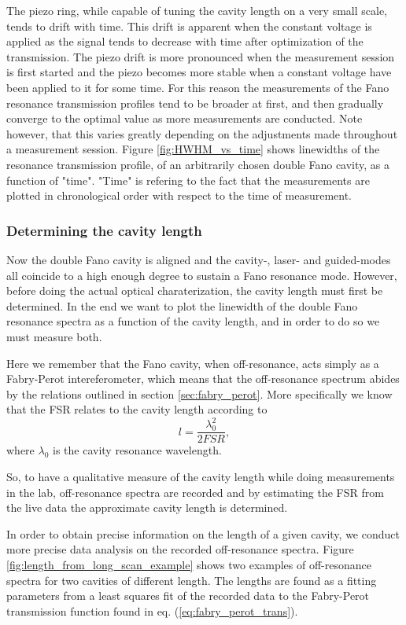 The piezo ring, while capable of tuning the cavity length on a very small scale, tends to drift with time. This drift is apparent when the constant voltage is applied as the signal tends to decrease with time after optimization of the transmission. The piezo drift is more pronounced when the measurement session is first started and the piezo becomes more stable when a constant voltage have been applied to it for some time. For this reason the measurements of the Fano resonance transmission profiles tend to be broader at first, and then gradually converge to the optimal value as more measurements are conducted. Note however, that this varies greatly depending on the adjustments made throughout a measurement session. Figure \ref{fig:HWHM_vs_time} shows linewidths of the resonance transmission profile, of an arbitrarily chosen double Fano cavity, as a function of "time". "Time" is refering to the fact that the measurements are plotted in chronological order with respect to the time of measurement. 

\subsubsection{Determining the cavity length}

Now the double Fano cavity is aligned and the cavity-, laser- and guided-modes all coincide to a high enough degree to sustain a Fano resonance mode. However, before doing the actual optical charaterization, the cavity length must first be determined. In the end we want to plot the linewidth of the double Fano resonance spectra as a function of the cavity length, and in order to do so we must measure both. 

Here we remember that the Fano cavity, when off-resonance, acts simply as a Fabry-Perot intereferometer, which means that the off-resonance spectrum abides by the relations outlined in section \ref{sec:fabry_perot}. More specifically we know that the FSR relates to the cavity length according to
\begin{equation}
    l = \frac{\lambda_0^2}{2 FSR},
    \label{eq:cavity_length_from_fsr}
\end{equation}
where $\lambda_0$ is the cavity resonance wavelength. 

So, to have a qualitative measure of the cavity length while doing measurements in the lab, off-resonance spectra are recorded and by estimating the FSR from the live data the approximate cavity length is determined.  

In order to obtain precise information on the length of a given cavity, we conduct more precise data analysis on the recorded off-resonance spectra. Figure \ref{fig:length_from_long_scan_example} shows two examples of off-resonance spectra for two cavities of different length. The lengths are found as a fitting parameters from a least squares fit of the recorded data to the Fabry-Perot transmission function found in eq. (\ref{eq:fabry_perot_trans}). 

